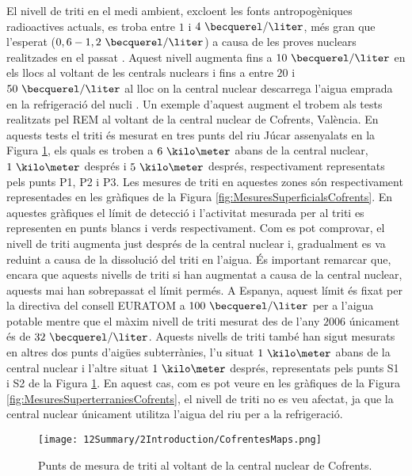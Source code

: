 El nivell de triti en el medi ambient, excloent les fonts antropogèniques radioactives actuals, es troba entre $1$ i $4~\becquerel/\liter$, més gran que l'esperat ($0,6-1,2~\becquerel/\liter$) a causa de les proves nuclears realitzades en el passat \cite{FranceTritiumEnvironment}. Aquest nivell augmenta fins a $10~\becquerel/\liter$ en els llocs al voltant de les centrals nuclears i fins a entre $20$ i $50~\becquerel/\liter$ al lloc on la central nuclear descarrega l'aigua emprada en la refrigeració del nucli \cite{FranceTritiumEnvironment}. Un exemple d'aquest augment el trobem als tests realitzats pel REM al voltant de la central nuclear de Cofrents, València. En aquests tests el triti és mesurat en tres punts del riu Júcar assenyalats en la Figura \ref{fig:PuntsMesuraTritiCofrents}, els quals es troben a $6~\kilo\meter$ abans de la central nuclear, $1~\kilo\meter$ després i $5~\kilo\meter$ després, respectivament representats pels punts P1, P2 i P3. Les mesures de triti en aquestes zones són respectivament representades en les gràfiques de la Figura \ref{fig:MesuresSuperficialsCofrents}. En aquestes gràfiques el límit de detecció i l'activitat mesurada per al triti es representen en punts blancs i verds respectivament. Com es pot comprovar, el nivell de triti augmenta just després de la central nuclear i, gradualment es va reduint a causa de la dissolució del triti en l'aigua. És important remarcar que, encara que aquests nivells de triti si han augmentat a causa de la central nuclear, aquests mai han sobrepassat el límit permés. A Espanya, aquest límit és fixat per la directiva del consell EURATOM a $100~\becquerel/\liter$ per a l'aigua potable \cite{100BqL} mentre que el màxim nivell de triti mesurat des de l'any $2006$ únicament és de $32~\becquerel/\liter$. Aquests nivells de triti també han sigut mesurats en altres dos punts d'aigües subterrànies, l'u situat $1~\kilo\meter$ abans de la central nuclear i l'altre situat $1~\kilo\meter$ després, representats pels punts S1 i S2 de la Figura \ref{fig:PuntsMesuraTritiCofrents}. En aquest cas, com es pot veure en les gràfiques de la Figura \ref{fig:MesuresSuperterraniesCofrents}, el nivell de triti no es veu afectat, ja que la central nuclear únicament utilitza l'aigua del riu per a la refrigeració.

\begin{figure}[hbtp]
\texttt{[image: 12Summary/2Introduction/CofrentesMaps.png]}
\centering
\caption{Punts de mesura de triti al voltant de la central nuclear de Cofrents.\label{fig:PuntsMesuraTritiCofrents}}
\end{figure}


